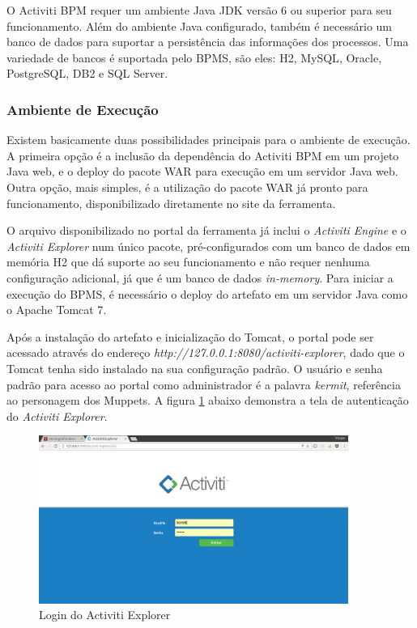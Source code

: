 O Activiti BPM requer um ambiente Java JDK versão 6 ou superior para seu funcionamento. Além do ambiente Java configurado, também é necessário um banco de dados para suportar a persistência das informações dos processos. Uma variedade de bancos é suportada pelo BPMS, são eles: H2\cite{db_h2}, MySQL\cite{db_mysql}, Oracle\cite{db_oracle}, PostgreSQL\cite{db_postgres}, DB2\cite{db_db2} e SQL Server\cite{db_sqlserver}.

\subsubsection{Ambiente de Execução}\label{sec:automatizacao_processos-ambiente_desenvolvimento}

Existem basicamente duas possibilidades principais para o ambiente de execução. A primeira opção é a inclusão da dependência do Activiti BPM em um projeto Java web, e o deploy do pacote WAR\cite{war} para execução em um servidor Java web. Outra opção, mais simples, é a utilização do pacote WAR já pronto para funcionamento, disponibilizado diretamente no site da ferramenta\cite{activiti_download}.

O arquivo disponibilizado no portal da ferramenta já inclui o \textit{Activiti Engine} e o \textit{Activiti Explorer} num único pacote, pré-configurados com um banco de dados em memória H2\cite{h2_inmemory} que dá suporte ao seu funcionamento e não requer nenhuma configuração adicional, já que é um banco de dados \textit{in-memory}\cite{h2_inmemory}. Para iniciar a execução do BPMS, é necessário o deploy do artefato em um servidor Java como o Apache Tomcat 7\cite{tomcat7}.

Após a instalação do artefato e inicialização do Tomcat, o portal pode ser acessado através do endereço \textit{http://127.0.0.1:8080/activiti-explorer}, dado que o Tomcat tenha sido instalado na sua configuração padrão. O usuário e senha padrão para acesso ao portal como administrador é a palavra \textit{kermit}, referência ao personagem dos Muppets\cite{kermit}. A figura \ref{fig:activiti_login} abaixo demonstra a tela de autenticação do \textit{Activiti Explorer}.

\begin{figure}[H]
\centering
\includegraphics[width=0.9\textwidth]{imagens/activiti_login.png}
\caption{Login do Activiti Explorer}
\label{fig:activiti_login}
\end{figure}


